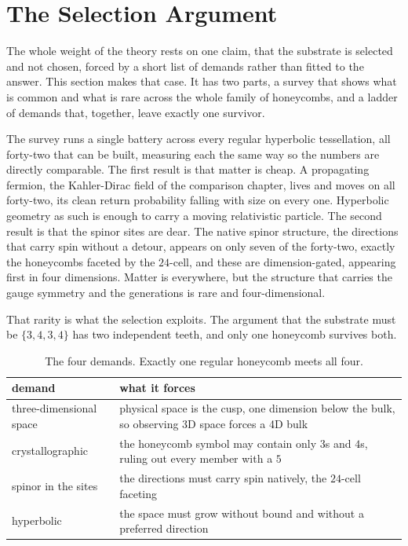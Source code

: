 \section{The Selection Argument}

The whole weight of the theory rests on one claim, that the substrate is selected and not chosen, forced by a short list of demands rather than fitted to the answer. This section makes that case. It has two parts, a survey that shows what is common and what is rare across the whole family of honeycombs, and a ladder of demands that, together, leave exactly one survivor.

The survey runs a single battery across every regular hyperbolic tessellation, all forty-two that can be built, measuring each the same way so the numbers are directly comparable. The first result is that matter is cheap. A propagating fermion, the Kahler-Dirac field of the comparison chapter, lives and moves on all forty-two, its clean return probability falling with size on every one. Hyperbolic geometry as such is enough to carry a moving relativistic particle. The second result is that the spinor sites are dear. The native spinor structure, the directions that carry spin without a detour, appears on only seven of the forty-two, exactly the honeycombs faceted by the $24$-cell, and these are dimension-gated, appearing first in four dimensions. Matter is everywhere, but the structure that carries the gauge symmetry and the generations is rare and four-dimensional.

That rarity is what the selection exploits. The argument that the substrate must be $\{3,4,3,4\}$ has two independent teeth, and only one honeycomb survives both.

\begin{table}[ht]
\centering
\begin{tabular}{@{}lp{}@{}}
\toprule
demand & what it forces \\
\midrule
three-dimensional space & physical space is the cusp, one dimension below the bulk, so observing 3D space forces a 4D bulk \\
crystallographic & the honeycomb symbol may contain only $3$s and $4$s, ruling out every member with a $5$ \\
spinor in the sites & the directions must carry spin natively, the $24$-cell faceting \\
hyperbolic & the space must grow without bound and without a preferred direction \\
\bottomrule
\end{tabular}
\caption{The four demands. Exactly one regular honeycomb meets all four.}
\label{tab:selection}
\end{table}

